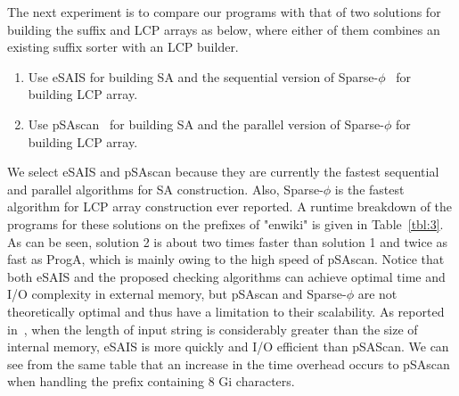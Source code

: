 \documentclass[10pt,journal,compsoc]{IEEEtran}
\begin{document}

The next experiment is to compare our programs with that of two solutions for building the suffix and LCP arrays as below, where either of them combines an existing suffix sorter with an LCP builder.

\begin{enumerate} [solut{i}on 1]
	\item Use eSAIS for building SA and the sequential version of Sparse-$\phi$~\cite{Karkkainen2016} for building LCP array.
	
	\item Use pSAscan~\cite{Karkkainen2015} for building SA and the parallel version of Sparse-$\phi$ for building LCP array.
\end{enumerate}

 We select eSAIS and pSAscan because they are currently the fastest sequential and parallel algorithms for SA construction. Also, Sparse-$\phi$ is the fastest algorithm for LCP array construction ever reported. A runtime breakdown of the programs for these solutions on the prefixes of "enwiki" is given in Table~\ref{tbl:3}. As can be seen, solution 2 is about two times faster than solution 1 and twice as fast as ProgA, which is mainly owing to the high speed of pSAscan. Notice that both eSAIS and the proposed checking algorithms can achieve optimal time and I/O complexity in external memory, but pSAscan and Sparse-$\phi$ are not theoretically optimal and thus have a limitation to their scalability. As reported in~\cite{Karkkainen2015}, when the length of input string is considerably greater than the size of internal memory, eSAIS is more quickly and I/O efficient than pSAScan. We can see from the same table that an increase in the time overhead occurs to pSAscan when handling the prefix containing 8 Gi characters.
 
\end{document}
